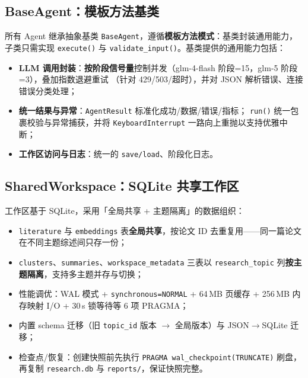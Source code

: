 \documentclass[10pt,a4paper]{article}
\begin{document}
\subsection{BaseAgent：模板方法基类}
所有 Agent 继承抽象基类 \texttt{BaseAgent}，遵循\textbf{模板方法模式}：基类封装通用能力，
子类只需实现 \texttt{execute()} 与 \texttt{validate\_input()}。基类提供的通用能力包括：
\begin{itemize}[leftmargin=2.2em,itemsep=0.05em]
  \item \textbf{LLM 调用封装}：\textbf{按阶段信号量}控制并发（glm-4-flash 阶段=15，glm-5 阶段=3），叠加指数退避重试
        （针对 429/503/超时），并对 JSON 解析错误、连接错误分类处理；
  \item \textbf{统一结果与异常}：\texttt{AgentResult} 标准化成功/数据/错误/指标；
        \texttt{run()} 统一包裹校验与异常捕获，并将 \texttt{KeyboardInterrupt} 一路向上重抛以支持优雅中断；
  \item \textbf{工作区访问与日志}：统一的 \texttt{save/load}、阶段化日志。
\end{itemize}

\subsection{SharedWorkspace：SQLite 共享工作区}
工作区基于 SQLite，采用「全局共享 + 主题隔离」的数据组织：
\begin{itemize}[leftmargin=2.2em,itemsep=0.05em]
  \item \texttt{literature} 与 \texttt{embeddings} 表\textbf{全局共享}，按论文 ID 去重复用——同一篇论文在不同主题综述间只存一份；
  \item \texttt{clusters}、\texttt{summaries}、\texttt{workspace\_metadata} 三表以 \texttt{research\_topic} 列\textbf{按主题隔离}，支持多主题并存与切换；
  \item 性能调优：WAL 模式 + \texttt{synchronous=NORMAL} + 64\,MB 页缓存 + 256\,MB 内存映射 I/O + 30\,s 锁等待等 6 项 PRAGMA；
  \item 内置 schema 迁移（旧 \texttt{topic\_id} 版本 $\rightarrow$ 全局版本）与 JSON$\rightarrow$SQLite 迁移；
  \item 检查点/恢复：创建快照前先执行 \texttt{PRAGMA wal\_checkpoint(TRUNCATE)} 刷盘，
        再复制 \texttt{research.db} 与 \texttt{reports/}，保证快照完整。
\end{itemize}
\end{document}
